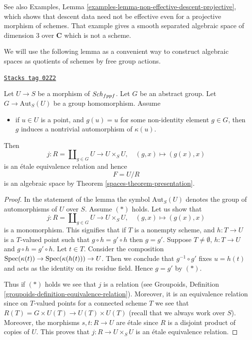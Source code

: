 See also Examples,
Lemma \ref{examples-lemma-non-effective-descent-projective},
which shows that descent data need not be effective
even for a projective morphism of schemes. That example
gives a smooth separated algebraic space of dimension 3
over ${\mathbf C}$ which is not a scheme.

\medskip\noindent
We will use the following lemma as a convenient way to construct
algebraic spaces as quotients of schemes by free group actions.

\begin{lemma}[Quotient]
\label{spaces-lemma-quotient}
\href{https://stacks.math.columbia.edu/tag/02Z2}{\texttt{Stacks tag 02Z2}}

Let $U \to S$ be a morphism of $\mathit{Sch}_{fppf}$.
Let $G$ be an abstract group. Let $G \to \text{Aut}_S(U)$
be a group homomorphism. Assume
\begin{itemize}
\item[(*)] if $u \in U$ is a point, and $g(u) = u$
for some non-identity element $g \in G$, then $g$
induces a nontrivial automorphism of $\kappa(u)$.
\end{itemize}
Then
$$
j :
R = \coprod\nolimits_{g \in G} U
\longrightarrow
U \times_S U,
\quad
(g, x) \longmapsto (g(x), x)
$$
is an \'etale equivalence relation and hence
$$
F = U/R
$$
is an algebraic space by Theorem \ref{spaces-theorem-presentation}.
\end{lemma}

\begin{proof}
In the statement of the lemma the symbol $\text{Aut}_S(U)$ denotes
the group of automorphisms of $U$ over $S$.
Assume $(*)$ holds. Let us show that
$$
j :
R = \coprod\nolimits_{g \in G} U
\longrightarrow
U \times_S U,
\quad
(g, x) \longmapsto (g(x), x)
$$
is a monomorphism. This signifies that if $T$ is a nonempty
scheme, and $h : T \to U$ is a $T$-valued point such that
$g \circ h = g' \circ h$ then $g = g'$. Suppose
$T \not = \emptyset$, $h : T \to U$ and $g \circ h = g' \circ h$.
Let $t \in T$. Consider the composition
$\operatorname{Spec}(\kappa(t)) \to \operatorname{Spec}(\kappa(h(t))) \to U$.
Then we conclude that $g^{-1} \circ g'$ fixes $u = h(t)$ and
acts as the identity on its residue field. Hence $g = g'$ by $(*)$.

\medskip\noindent
Thus if $(*)$ holds we see that $j$ is a relation (see
Groupoids, Definition \ref{groupoids-definition-equivalence-relation}).
Moreover, it is an equivalence relation since on $T$-valued points
for a connected scheme $T$ we see that
$R(T) = G \times U(T) \to U(T) \times U(T)$ (recall that we always
work over $S$). Moreover, the morphisms $s, t : R \to U$ are \'etale
since $R$ is a disjoint product of copies of $U$.
This proves that $j : R \to U \times_S U$ is an \'etale equivalence relation.
\end{proof}

